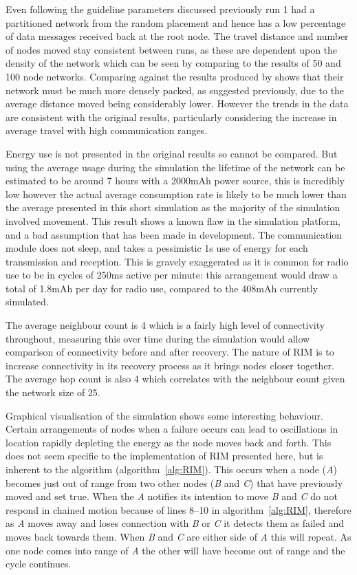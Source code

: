 \documentclass[authoryearcitations]{UoYCSproject}
\begin{document}
Even following the guideline parameters discussed previously run 1 had a partitioned network from the random placement and hence has a low percentage of data messages received back at the root node. The travel distance and number of nodes moved stay consistent between runs, as these are dependent upon the density of the network which can be seen by comparing to the results of 50 and 100 node networks. Comparing against the results produced by \citeauthor*{Younis2010} shows that their network must be much more densely packed, as suggested previously, due to the average distance moved being considerably lower. However the trends in the data are consistent with the original results, particularly considering the increase in average travel with high communication ranges.

Energy use is not presented in the original results so cannot be compared. But using the average usage during the simulation the lifetime of the network can be estimated to be around 7 hours with a 2000mAh power source, this is incredibly low however the actual average consumption rate is likely to be much lower than the average presented in this short simulation as the majority of the simulation involved movement. This result shows a known flaw in the simulation platform, and a bad assumption that has been made in development. The communication module does not sleep, and takes a pessimistic 1s use of energy for each transmission and reception. This is gravely exaggerated as it is common for radio use to be in cycles of 250ms active per minute: this arrangement would draw a total of 1.8mAh per day for radio use, compared to the 408mAh currently simulated.

The average neighbour count is 4 which is a fairly high level of connectivity throughout, measuring this over time during the simulation would allow comparison of connectivity before and after recovery. The nature of RIM is to increase connectivity in its recovery process as it brings nodes closer together. The average hop count is also 4 which correlates with the neighbour count given the network size of 25.

Graphical visualisation of the simulation shows some interesting behaviour. Certain arrangements of nodes when a failure occurs can lead to oscillations in location rapidly depleting the energy as the node moves back and forth. This does not seem specific to the implementation of RIM presented here, but is inherent to the algorithm (algorithm~\ref{alg:RIM}). This occurs when a node (\emph{A}) becomes just out of range from two other nodes (\emph{B} and \emph{C}) that have previously moved and set  true. When the \emph{A} notifies its intention to move \emph{B} and \emph{C} do not respond in chained motion because of lines 8--10 in algorithm~\ref{alg:RIM}, therefore as \emph{A} moves away and loses connection with \emph{B} or \emph{C} it detects them as failed and moves back towards them. When \emph{B} and \emph{C} are either side of \emph{A} this will repeat. As one node comes into range of \emph{A} the other will have become out of range and the cycle continues.
\end{document}
